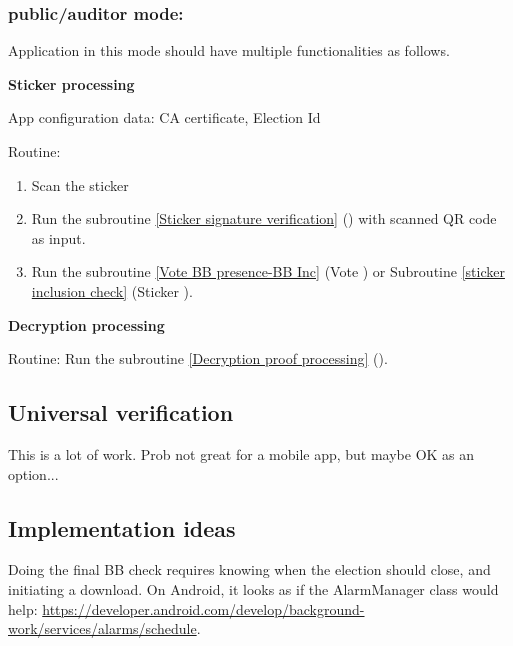 \documentclass{article}
\begin{document}
\subsubsection{\localVotingCenter{}  public/auditor mode:}
Application in this mode should have multiple functionalities as follows.


\textbf{Sticker processing}

App configuration data: CA certificate, Election Id

Routine:
\begin{enumerate}
    \item Scan the sticker
    \item Run the subroutine \ref{Sticker signature verification} (\StickersignatureVerification{}) with scanned QR code as input.
    \item Run the subroutine \ref{Vote BB presence-BB Inc} (Vote \BBInclusionCheck{}) or Subroutine \ref{sticker inclusion check} (Sticker \BBInclusionCheck{}).

\end{enumerate}

\textbf{Decryption processing}

Routine: Run the subroutine \ref{Decryption proof processing} (\DecryptionProof{}).

\subsection{Universal verification}
    This is a lot of work. Prob not great for a mobile app, but maybe OK as an option...


    \subsection{Implementation ideas}
    Doing the final BB check requires knowing when the election should close, and initiating a download. On Android, it looks as if the AlarmManager class would help: \url{https://developer.android.com/develop/background-work/services/alarms/schedule}.
\end{document}
